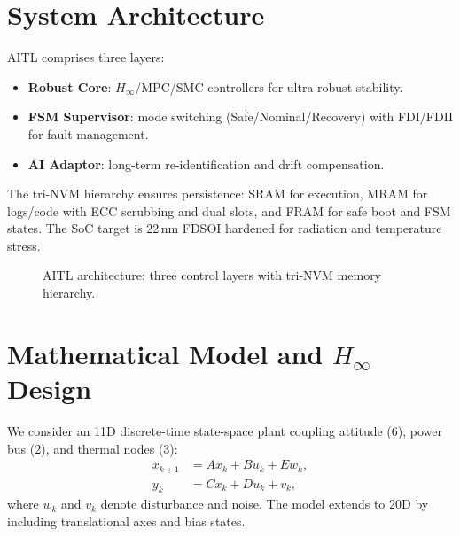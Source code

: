 \documentclass[conference]{IEEEtran}
\begin{document}
\section{System Architecture}
AITL comprises three layers:
\begin{itemize}
  \item \textbf{Robust Core}: $H_\infty$/MPC/SMC controllers for ultra-robust stability.
  \item \textbf{FSM Supervisor}: mode switching (Safe/Nominal/Recovery) with FDI/FDII for fault management.
  \item \textbf{AI Adaptor}: long-term re-identification and drift compensation.
\end{itemize}

The tri-NVM hierarchy ensures persistence: SRAM for execution, MRAM for logs/code with ECC scrubbing and dual slots, and FRAM for safe boot and FSM states. The SoC target is 22\,nm FD\!SOI hardened for radiation and temperature stress.

\begin{figure}[t]
\centering
{}
\caption{AITL architecture: three control layers with tri-NVM memory hierarchy.}
\label{fig:arch}
\end{figure}

\section{Mathematical Model and $H_\infty$ Design}
We consider an 11D discrete-time state-space plant coupling attitude (6), power bus (2), and thermal nodes (3):
\begin{align}
  x_{k+1} &= A x_k + B u_k + E w_k, \\
  y_k &= C x_k + D u_k + v_k,
\end{align}
where $w_k$ and $v_k$ denote disturbance and noise. The model extends to 20D by including translational axes and bias states.
\end{document}
